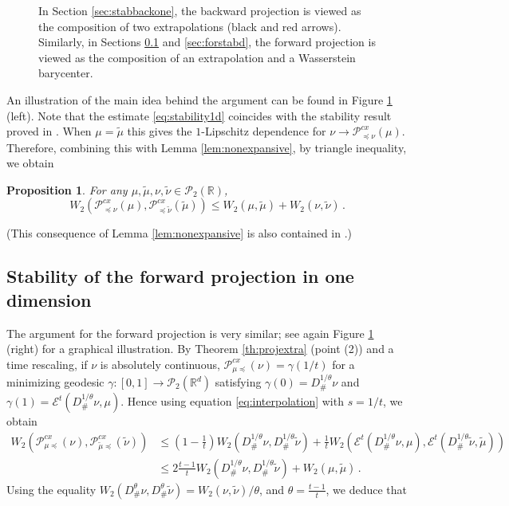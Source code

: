 \documentclass[12pt]{amsart}
\def\mc#1{\mathcal{#1}}
\newtheorem{proposition}{Proposition}
\begin{document}
\begin{figure}

\caption{In Section \ref{sec:stabbackone}, the backward projection is viewed as the composition of two extrapolations (black and red arrows). Similarly, in Sections \ref{sec:stabforwardone} and \ref{sec:forstabd}, the forward projection is viewed as the composition of an extrapolation and a Wasserstein barycenter. }\label{fig:illustration}
\end{figure}

 An illustration of the main idea behind the argument can be found in Figure \ref{fig:illustration} (left).
Note that the estimate \eqref{eq:stability1d} coincides with the stability result proved in \cite{jourdain2023lipschitz}.  {When $\mu=\tilde \mu$ this gives the $1$-Lipschitz dependence for $\nu \to \mathscr{P}^{cx}_{\preceq \nu} (\mu)$. Therefore,} combining this with Lemma \ref{lem:nonexpansive}, by triangle inequality, we obtain
\begin{proposition}
    For any $\mu, \tilde{\mu},\nu,\tilde{\nu}\in\mc{P}_2(\mathbb{R})$,
\[
W_2(\mathscr{P}_{\preceq \nu}^{cx}(\mu),\mathscr{P}_{\preceq \tilde{\nu}}^{cx}(\tilde{\mu}))\leq W_2(\mu,\tilde{\mu})+ W_2(\nu,\tilde{\nu})\,.
\]
\end{proposition}
{(This consequence of Lemma \ref{lem:nonexpansive} is also contained in \cite[Corollary 2.3]{alfonsi2025wasserstein}.)}
\subsection{Stability of the forward projection in one dimension} \label{sec:stabforwardone} The argument for the forward projection is very similar; see again Figure \ref{fig:illustration} (right) for a graphical illustration.
By Theorem \ref{th:projextra} (point (2)) and a time rescaling, if $\nu$ is absolutely continuous, $\mathscr{P}_{\mu \preceq }^{cx}(\nu) = {\gamma}(1/t)$ for a minimizing geodesic ${\gamma}:[0,1]\rightarrow \mc{P}_2(\mathbb{R}^d)$ satisfying ${\gamma}(0)= D^{1/\theta}_\#\nu$ and ${\gamma}(1) = \mathscr{E}^t(D^{1/\theta}_\#\nu, \mu)$. Hence using equation \eqref{eq:interpolation} with $s= 1/t$, we obtain
\[
\begin{aligned}
W_2(\mathscr{P}_{\mu \preceq }^{cx}(\nu), \mathscr{P}_{\tilde{\mu} \preceq }^{cx}(\tilde{\nu}))&\leq \left(1 - \frac{1}{t}\right) W_2(D^{1/\theta}_\#\nu,D^{1/\theta}_\#\tilde{\nu}) + \frac{1}{t}W_2(\mathscr{E}^t(D^{1/\theta}_\#\nu,  \mu),\mathscr{E}^t(D^{1/\theta}_\#\tilde{\nu}, \tilde{\mu}))\\
& \leq 2\frac{t-1}{t} W_2(D^{1/\theta}_\#\nu,D^{1/\theta}_\#\tilde{\nu}) +  W_2(\mu, \tilde{\mu})\,.
\end{aligned}
\]
Using the equality $ W_2(D^\theta_\# \nu, D^\theta_\#\tilde{\nu}) = W_2(\nu,\tilde{\nu})/\theta$, and $\theta = \frac{t-1}{t}$,  we deduce that
\end{document}
